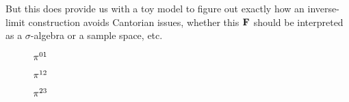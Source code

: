 \documentclass{article}
\begin{document}
But this does provide us with a toy model to figure out exactly how an inverse-limit construction avoids Cantorian issues, whether this $\EVENT$ should be interpreted as a $\sigma$-algebra or a sample space, etc. 

\begin{figure}
    \centering
    
    \caption{$\pi^{01}$}
    \label{fig:proj01}
\end{figure}

\begin{figure}
    \centering
    
    \caption{$\pi^{12}$}
    \label{fig:proj12}
\end{figure}

\begin{figure}
    \centering
    
    \caption{$\pi^{23}$}
    \label{fig:proj23}
\end{figure}
\end{document}
